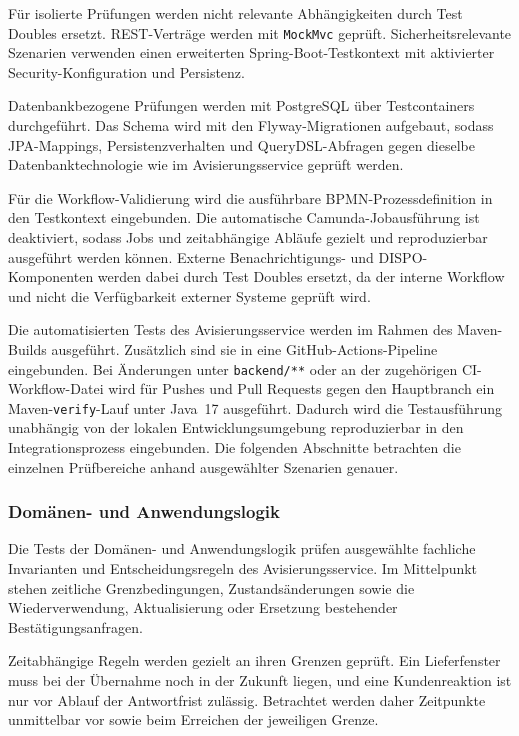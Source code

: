 Für isolierte Prüfungen werden nicht relevante Abhängigkeiten durch Test
Doubles ersetzt. REST-Verträge werden mit \texttt{MockMvc} geprüft.
Sicherheitsrelevante Szenarien verwenden einen erweiterten
Spring-Boot-Testkontext mit aktivierter Security-Konfiguration und Persistenz.

Datenbankbezogene Prüfungen werden mit PostgreSQL über Testcontainers
durchgeführt. Das Schema wird mit den Flyway-Migrationen aufgebaut, sodass
JPA-Mappings, Persistenzverhalten und QueryDSL-Abfragen gegen dieselbe
Datenbanktechnologie wie im Avisierungsservice geprüft werden.

Für die Workflow-Validierung wird die ausführbare BPMN-Prozessdefinition in den
Testkontext eingebunden. Die automatische Camunda-Jobausführung ist deaktiviert,
sodass Jobs und zeitabhängige Abläufe gezielt und reproduzierbar ausgeführt
werden können. Externe Benachrichtigungs- und DISPO-Komponenten werden dabei
durch Test Doubles ersetzt, da der interne Workflow und nicht die Verfügbarkeit
externer Systeme geprüft wird.

Die automatisierten Tests des Avisierungsservice werden im Rahmen des
Maven-Builds ausgeführt. Zusätzlich sind sie in eine GitHub-Actions-Pipeline
eingebunden. Bei Änderungen unter \texttt{backend/**} oder an der zugehörigen
CI-Workflow-Datei wird für Pushes und Pull Requests gegen den Hauptbranch ein
Maven-\texttt{verify}-Lauf unter Java~17 ausgeführt. Dadurch wird die
Testausführung unabhängig von der lokalen Entwicklungsumgebung reproduzierbar
in den Integrationsprozess eingebunden. Die folgenden Abschnitte betrachten die
einzelnen Prüfbereiche anhand ausgewählter Szenarien genauer.

\subsubsection{Domänen- und Anwendungslogik}
\label{sec:test-domaenen-anwendungslogik}

Die Tests der Domänen- und Anwendungslogik prüfen ausgewählte fachliche
Invarianten und Entscheidungsregeln des Avisierungsservice. Im Mittelpunkt
stehen zeitliche Grenzbedingungen, Zustandsänderungen sowie die
Wiederverwendung, Aktualisierung oder Ersetzung bestehender
Bestätigungsanfragen.

Zeitabhängige Regeln werden gezielt an ihren Grenzen geprüft. Ein Lieferfenster
muss bei der Übernahme noch in der Zukunft liegen, und eine Kundenreaktion ist
nur vor Ablauf der Antwortfrist zulässig. Betrachtet werden daher Zeitpunkte
unmittelbar vor sowie beim Erreichen der jeweiligen Grenze.

